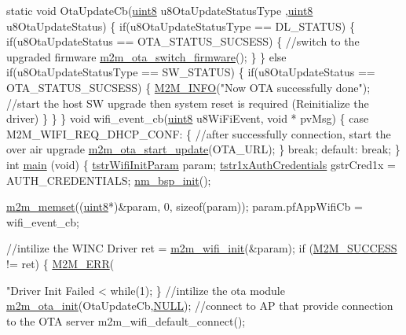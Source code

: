 \begin{DoxyCode}
\textcolor{keyword}{static} \textcolor{keywordtype}{void} OtaUpdateCb(\hyperlink{group__DataT_ga4df709a77647e870bbf1d955b8edc9a6}{uint8} u8OtaUpdateStatusType ,\hyperlink{group__DataT_ga4df709a77647e870bbf1d955b8edc9a6}{uint8} u8OtaUpdateStatus)
\{
    \textcolor{keywordflow}{if}(u8OtaUpdateStatusType == DL\_STATUS) \{
        \textcolor{keywordflow}{if}(u8OtaUpdateStatus == OTA\_STATUS\_SUCSESS) \{
            \textcolor{comment}{//switch to the upgraded firmware}
            \hyperlink{group__OtaSwitchFirmware_ga464a45a53473152d5a78c578ae0edd8a}{m2m\_ota\_switch\_firmware}();
        \}
    \}
    \textcolor{keywordflow}{else} \textcolor{keywordflow}{if}(u8OtaUpdateStatusType == SW\_STATUS) \{
        \textcolor{keywordflow}{if}(u8OtaUpdateStatus == OTA\_STATUS\_SUCSESS) \{
            \hyperlink{nm__common_8h_a84108eca2655e811179386a39c62acf2}{M2M\_INFO}(\textcolor{stringliteral}{"Now OTA successfully done"});
            \textcolor{comment}{//start the host SW upgrade then system reset is required (Reinitialize the driver)}
        \}
    \}
\}
\textcolor{keywordtype}{void} wifi\_event\_cb(\hyperlink{group__DataT_ga4df709a77647e870bbf1d955b8edc9a6}{uint8} u8WiFiEvent, \textcolor{keywordtype}{void} * pvMsg)
\{
    \textcolor{keywordflow}{case} M2M\_WIFI\_REQ\_DHCP\_CONF:
    \{
        \textcolor{comment}{//after successfully connection, start the over air upgrade}
        \hyperlink{group__OtaStartUpdatefn_gac50387eab16b3257f1c037942f2682fd}{m2m\_ota\_start\_update}(OTA\_URL);
    \}
    \textcolor{keywordflow}{break};
    \textcolor{keywordflow}{default}:
    \textcolor{keywordflow}{break};
\}
\textcolor{keywordtype}{int} \hyperlink{demo_2microchip_2pic32mz__ef__curiosity_2wifi__http__server__demo_2src_2main_8c_ac5a1eca594b063e0d2dbccf86f96f221}{main} (\textcolor{keywordtype}{void})
\{
    \hyperlink{structtstrWifiInitParam}{tstrWifiInitParam} param;
    \hyperlink{structtstr1xAuthCredentials}{tstr1xAuthCredentials} gstrCred1x    = AUTH\_CREDENTIALS;
    \hyperlink{group__NmBspInitFn_ga91533a50cf3da832110a746b4a57789e}{nm\_bsp\_init}();
    
    \hyperlink{nm__common_8h_ad4de761e451e6416e7e21d6abc4fb776}{m2m\_memset}((\hyperlink{group__DataT_ga4df709a77647e870bbf1d955b8edc9a6}{uint8}*)&param, 0, \textcolor{keyword}{sizeof}(param));
    param.pfAppWifiCb = wifi\_event\_cb;
    
    \textcolor{comment}{//intilize the WINC Driver}
    ret = \hyperlink{group__WifiInitFn_ga73c734812e844d96d860c4e93e9daf35}{m2m\_wifi\_init}(&param);
    \textcolor{keywordflow}{if} (\hyperlink{nm__common_8h_a9ef27ba27aafdd1aa3a79d3ba2c36b8f}{M2M\_SUCCESS} != ret)
    \{
        \hyperlink{nm__common_8h_a34d005df494e50b05cd38b80f318d7ac}{M2M\_ERR}(\textcolor{stringliteral}{"Driver Init Failed <%
        \textcolor{keywordflow}{while}(1);
    \}
    \textcolor{comment}{//intilize the ota module}
    \hyperlink{group__OtaInitFn_gacd2a1a8ffaccc3deb1970cf1ad41ceec}{m2m\_ota\_init}(OtaUpdateCb,\hyperlink{group__BSPDefine_ga070d2ce7b6bb7e5c05602aa8c308d0c4}{NULL});
    \textcolor{comment}{//connect to AP that provide connection to the OTA server}
    m2m\_wifi\_default\_connect();

}
\end{DoxyCode}
